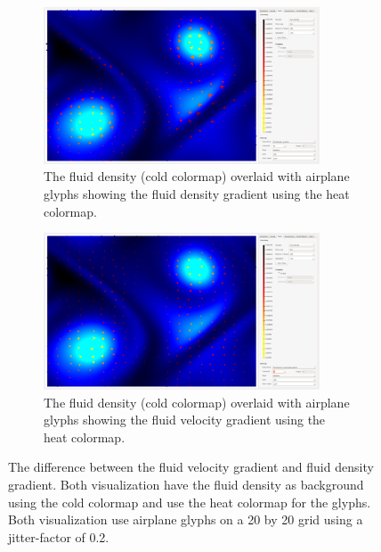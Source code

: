 \begin{figure}[tbh]
	\centering
	\begin{subfigure}{0.45\textwidth}
		\centering
		\includegraphics[width=0.9\textwidth, trim={35px 30px 430px 30px}, clip]{img/gradient/fluid_density_gradient}
		\caption{The fluid density (cold colormap) overlaid with airplane glyphs showing the fluid density gradient using the heat colormap.}
		\label{fig:gradients:density}
	\end{subfigure}
	\hspace{30px}
	\begin{subfigure}{0.45\textwidth}	
		\centering
		\includegraphics[width=0.9\textwidth, trim={35px 30px 430px 30px}, clip]{img/gradient/fluid_velocity_gradient}
		\caption{The fluid density (cold colormap) overlaid with airplane glyphs showing the fluid velocity gradient using the heat colormap.}
		\label{fig:gradients:velocity}
	\end{subfigure}
	\caption{The difference between the fluid velocity gradient and fluid density gradient. Both visualization have the fluid density as background using the cold colormap and use the heat colormap for the glyphs. Both visualization use airplane glyphs on a 20 by 20 grid using a jitter-factor of 0.2.}
	\label{fig:gradients}
\end{figure}


